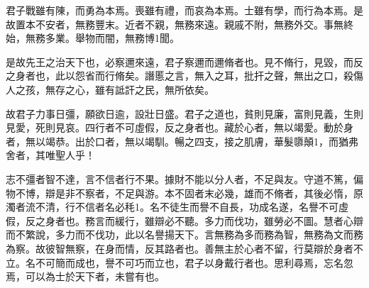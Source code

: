 
\begin{pinyinscope}
君子戰雖有陳，而勇為本焉。喪雖有禮，而哀為本焉。士雖有學，而行為本焉。是故置本不安者，無務豐末。近者不親，無務來遠。親戚不附，無務外交。事無終始，無務多業。舉物而闇，無務博1聞。

是故先王之治天下也，必察邇來遠，君子察邇而邇脩者也。見不脩行，見毀，而反之身者也，此以怨省而行脩矣。譖慝之言，無入之耳，批扞之聲，無出之口，殺傷人之孩，無存之心，雖有詆訐之民，無所依矣。

故君子力事日彊，願欲日逾，設壯日盛。君子之道也，貧則見廉，富則見義，生則見愛，死則見哀。四行者不可虛假，反之身者也。藏於心者，無以竭愛。動於身者，無以竭恭。出於口者，無以竭馴。暢之四支，接之肌膚，華髮隳顛1，而猶弗舍者，其唯聖人乎！

志不彊者智不達，言不信者行不果。據財不能以分人者，不足與友。守道不篤，偏物不博，辯是非不察者，不足與游。本不固者末必幾，雄而不脩者，其後必惰，原濁者流不清，行不信者名必秏1。名不徒生而譽不自長，功成名遂，名譽不可虛假，反之身者也。務言而緩行，雖辯必不聽。多力而伐功，雖勞必不圖。慧者心辯而不繁說，多力而不伐功，此以名譽揚天下。言無務為多而務為智，無務為文而務為察。故彼智無察，在身而情，反其路者也。善無主於心者不留，行莫辯於身者不立。名不可簡而成也，譽不可巧而立也，君子以身戴行者也。思利尋焉，忘名忽焉，可以為士於天下者，未嘗有也。


\end{pinyinscope}
